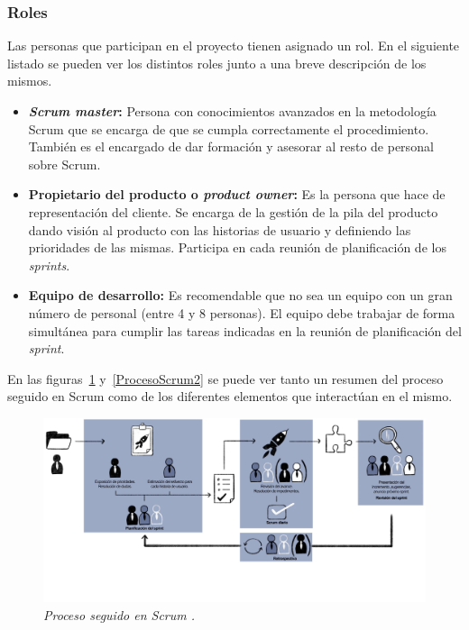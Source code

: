 \subsubsection{Roles}
Las personas que participan en el proyecto tienen asignado un rol. En el siguiente listado se pueden ver los distintos roles junto a una breve descripción de los mismos.
\begin{itemize}
\item \textbf{\textit{Scrum master}:}
Persona con conocimientos avanzados en la metodología Scrum que se encarga de que se cumpla correctamente el procedimiento. También es el encargado de dar formación y asesorar al resto de personal sobre Scrum.

\item \textbf{Propietario del producto o \textit{product owner}:}
Es la persona que hace de representación del cliente. Se encarga de la gestión de la pila del producto dando visión al producto con las historias de usuario y definiendo las prioridades de las mismas. Participa en cada reunión de planificación de los \textit{sprints}.

\item \textbf{Equipo de desarrollo:}
Es recomendable que no sea un equipo con un gran número de personal (entre 4 y 8 personas). El equipo debe trabajar de forma simultánea para cumplir las tareas indicadas en la reunión de planificación del \textit{sprint}.
\end{itemize}

En las figuras~\ref{ProcesoScrum1} y~\ref{ProcesoScrum2} se puede ver tanto un resumen del proceso seguido en Scrum como de los diferentes elementos que interactúan en el mismo.

\begin{figure}
	\centering
	\includegraphics[width=\textwidth]{../img/Scrum/Scrum.png}
	\caption{\textit{Proceso seguido en Scrum \cite{scrum}.}}\label{ProcesoScrum1}
\end{figure}


